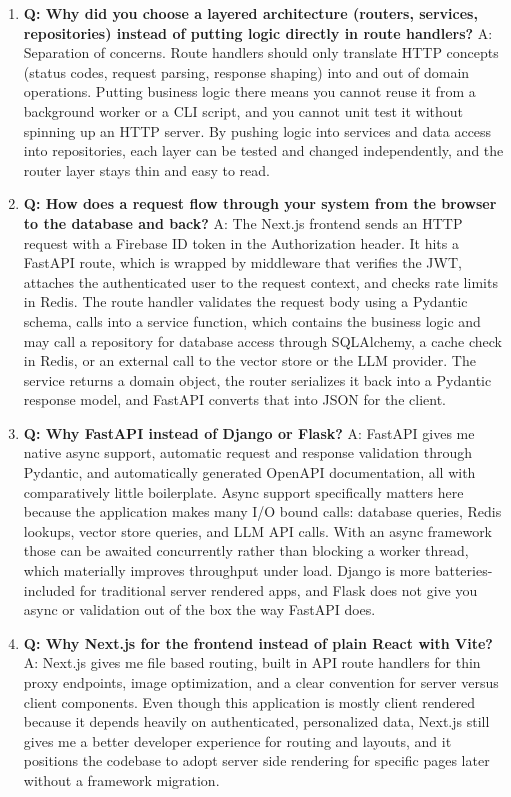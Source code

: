 \documentclass[11pt,a4paper]{report}
\begin{document}
\begin{enumerate}[leftmargin=*]
\item \textbf{Q: Why did you choose a layered architecture (routers, services, repositories) instead of putting logic directly in route handlers?}
A: Separation of concerns. Route handlers should only translate HTTP concepts (status codes, request parsing, response shaping) into and out of domain operations. Putting business logic there means you cannot reuse it from a background worker or a CLI script, and you cannot unit test it without spinning up an HTTP server. By pushing logic into services and data access into repositories, each layer can be tested and changed independently, and the router layer stays thin and easy to read.

\item \textbf{Q: How does a request flow through your system from the browser to the database and back?}
A: The Next.js frontend sends an HTTP request with a Firebase ID token in the Authorization header. It hits a FastAPI route, which is wrapped by middleware that verifies the JWT, attaches the authenticated user to the request context, and checks rate limits in Redis. The route handler validates the request body using a Pydantic schema, calls into a service function, which contains the business logic and may call a repository for database access through SQLAlchemy, a cache check in Redis, or an external call to the vector store or the LLM provider. The service returns a domain object, the router serializes it back into a Pydantic response model, and FastAPI converts that into JSON for the client.

\item \textbf{Q: Why FastAPI instead of Django or Flask?}
A: FastAPI gives me native async support, automatic request and response validation through Pydantic, and automatically generated OpenAPI documentation, all with comparatively little boilerplate. Async support specifically matters here because the application makes many I/O bound calls: database queries, Redis lookups, vector store queries, and LLM API calls. With an async framework those can be awaited concurrently rather than blocking a worker thread, which materially improves throughput under load. Django is more batteries-included for traditional server rendered apps, and Flask does not give you async or validation out of the box the way FastAPI does.

\item \textbf{Q: Why Next.js for the frontend instead of plain React with Vite?}
A: Next.js gives me file based routing, built in API route handlers for thin proxy endpoints, image optimization, and a clear convention for server versus client components. Even though this application is mostly client rendered because it depends heavily on authenticated, personalized data, Next.js still gives me a better developer experience for routing and layouts, and it positions the codebase to adopt server side rendering for specific pages later without a framework migration.


\end{enumerate}
\end{document}
